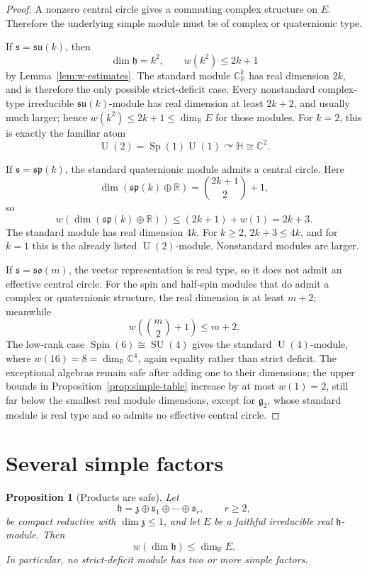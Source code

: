 \documentclass[11pt]{article}
\newtheorem{proposition}[theorem]{Proposition}
\theoremstyle{remark}
\newcommand{\RR}{\mathbb{R}}
\newcommand{\CC}{\mathbb{C}}
\newcommand{\HH}{\mathbb{H}}
\newcommand{\fh}{\mathfrak{h}}
\newcommand{\fs}{\mathfrak{s}}
\newcommand{\fz}{\mathfrak{z}}
\newcommand{\so}{\mathfrak{so}}
\newcommand{\su}{\mathfrak{su}}
\newcommand{\spalg}{\mathfrak{sp}}
\newcommand{\Spin}{\operatorname{Spin}}
\newcommand{\SU}{\operatorname{SU}}
\newcommand{\U}{\operatorname{U}}
\newcommand{\Sp}{\operatorname{Sp}}
\begin{document}
\begin{proof}
A nonzero central circle gives a commuting complex structure on \(E\).  Therefore the underlying simple module must be of complex or quaternionic type.

If \(\fs=\su(k)\), then
\[
  \dim\fh=k^2,
  \qquad
  w(k^2)\leq 2k+1
\]
by Lemma~\ref{lem:w-estimates}.  The standard module \(\CC^k_{\RR}\) has real dimension \(2k\), and is therefore the only possible strict-deficit case.  Every nonstandard complex-type irreducible \(\su(k)\)-module has real dimension at least \(2k+2\), and usually much larger; hence \(w(k^2)\leq 2k+1\leq \dim_{\RR}E\) for those modules.  For \(k=2\), this is exactly the familiar atom
\[
  \U(2)=\Sp(1)\U(1)\curvearrowright \HH\cong\CC^2.
\]

If \(\fs=\spalg(k)\), the standard quaternionic module admits a central circle.  Here
\[
  \dim(\spalg(k)\oplus\RR)=\binom{2k+1}{2}+1,
\]
so
\[
  w(\dim(\spalg(k)\oplus\RR))
  \leq (2k+1)+w(1)
  =2k+3.
\]
The standard module has real dimension \(4k\).  For \(k\geq 2\), \(2k+3\leq 4k\), and for \(k=1\) this is the already listed \(\U(2)\)-module.  Nonstandard modules are larger.

If \(\fs=\so(m)\), the vector representation is real type, so it does not admit an effective central circle.  For the spin and half-spin modules that do admit a complex or quaternionic structure, the real dimension is at least \(m+2\); meanwhile
\[
  w\!\left(\binom m2+1\right)\leq m+2.
\]
The low-rank case \(\Spin(6)\cong\SU(4)\) gives the standard \(\U(4)\)-module, where \(w(16)=8=\dim_{\RR}\CC^4\), again equality rather than strict deficit.  The exceptional algebras remain safe after adding one to their dimensions; the upper bounds in Proposition~\ref{prop:simple-table} increase by at most \(w(1)=2\), still far below the smallest real module dimensions, except for \(\mathfrak g_2\), whose standard module is real type and so admits no effective central circle.
\end{proof}

\section{Several simple factors}

\begin{proposition}[Products are safe]\label{prop:products-safe}
Let
\[
  \fh=\fz\oplus\fs_1\oplus\cdots\oplus\fs_r,
  \qquad r\geq 2,
\]
be compact reductive with \(\dim\fz\leq 1\), and let \(E\) be a faithful irreducible real \(\fh\)-module.  Then
\[
  w(\dim\fh)\leq \dim_{\RR}E.
\]
In particular, no strict-deficit module has two or more simple factors.
\end{proposition}
\end{document}

